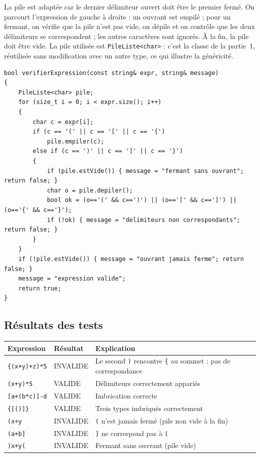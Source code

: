 \documentclass[11pt,a4paper]{article}
\begin{document}
La pile est adaptée car le dernier délimiteur ouvert doit être le premier fermé. On parcourt l'expression de gauche à droite : un ouvrant est empilé ; pour un fermant, on vérifie que la pile n'est pas vide, on dépile et on contrôle que les deux délimiteurs se correspondent ; les autres caractères sont ignorés. À la fin, la pile doit être vide. La pile utilisée est \texttt{PileListe<char>} : c'est la classe de la partie~1, réutilisée sans modification avec un autre type, ce qui illustre la généricité.

\begin{lstlisting}
bool verifierExpression(const string& expr, string& message)
{
    PileListe<char> pile;
    for (size_t i = 0; i < expr.size(); i++)
    {
        char c = expr[i];
        if (c == '(' || c == '[' || c == '{')
            pile.empiler(c);
        else if (c == ')' || c == ']' || c == '}')
        {
            if (pile.estVide()) { message = "fermant sans ouvrant"; return false; }
            char o = pile.depiler();
            bool ok = (o=='(' && c==')') || (o=='[' && c==']') || (o=='{' && c=='}');
            if (!ok) { message = "delimiteurs non correspondants"; return false; }
        }
    }
    if (!pile.estVide()) { message = "ouvrant jamais ferme"; return false; }
    message = "expression valide";
    return true;
}
\end{lstlisting}

\subsection{Résultats des tests}

\begin{center}
\renewcommand{\arraystretch}{1.2}
\begin{tabularx}{\textwidth}{@{}l l X@{}}
\toprule
\textbf{Expression} & \textbf{Résultat} & \textbf{Explication} \\
\midrule
\texttt{\{(x+y)+z)*5} & INVALIDE & Le second \texttt{)} rencontre \texttt{\{} au sommet : pas de correspondance \\
\texttt{(x+y)*5}      & VALIDE   & Délimiteurs correctement appariés \\
\texttt{[a+(b*c)]-d}  & VALIDE   & Imbrication correcte \\
\texttt{\{[()]\}}     & VALIDE   & Trois types imbriqués correctement \\
\texttt{(x+y}         & INVALIDE & \texttt{(} n'est jamais fermé (pile non vide à la fin) \\
\texttt{(a+b]}        & INVALIDE & \texttt{]} ne correspond pas à \texttt{(} \\
\texttt{)x+y(}        & INVALIDE & Fermant sans ouvrant (pile vide) \\
\bottomrule
\end{tabularx}
\end{center}
\end{document}
